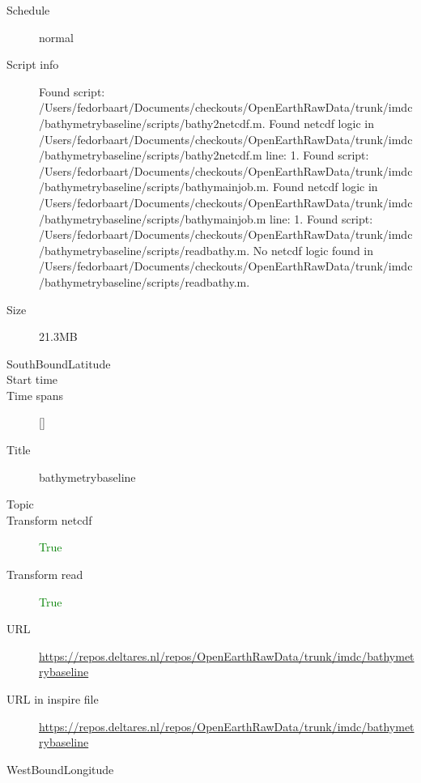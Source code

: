 \documentclass[9]{report}
\begin{document}
\begin{description}
\begin{verbatim}
\end{verbatim}
  \item[Schedule] normal
  \item[Script info] Found script: /Users/fedorbaart/Documents/checkouts/OpenEarthRawData/trunk/imdc/bathymetrybaseline/scripts/bathy2netcdf.m.
Found netcdf logic in /Users/fedorbaart/Documents/checkouts/OpenEarthRawData/trunk/imdc/bathymetrybaseline/scripts/bathy2netcdf.m line: 1.
Found script: /Users/fedorbaart/Documents/checkouts/OpenEarthRawData/trunk/imdc/bathymetrybaseline/scripts/bathymainjob.m.
Found netcdf logic in /Users/fedorbaart/Documents/checkouts/OpenEarthRawData/trunk/imdc/bathymetrybaseline/scripts/bathymainjob.m line: 1.
Found script: /Users/fedorbaart/Documents/checkouts/OpenEarthRawData/trunk/imdc/bathymetrybaseline/scripts/readbathy.m.
No netcdf logic found in /Users/fedorbaart/Documents/checkouts/OpenEarthRawData/trunk/imdc/bathymetrybaseline/scripts/readbathy.m.
  \item[Size] 21.3MB
  \item[SouthBoundLatitude] 
  \item[Start time] 
  \item[Time spans] []
  \item[Title]  bathymetrybaseline 
  \item[Topic] 
  \item[Transform netcdf] \textcolor{green}{True}
  \item[Transform read] \textcolor{green}{True}
  \item[URL] \href{https://repos.deltares.nl/repos/OpenEarthRawData/trunk/imdc/bathymetrybaseline}{https://repos.deltares.nl/repos/OpenEarthRawData/trunk/imdc/bathymetrybaseline}
  \item[URL in inspire file] \href{https://repos.deltares.nl/repos/OpenEarthRawData/trunk/imdc/bathymetrybaseline}{https://repos.deltares.nl/repos/OpenEarthRawData/trunk/imdc/bathymetrybaseline}
  \item[WestBoundLongitude] 
\end{description}
\end{document}
